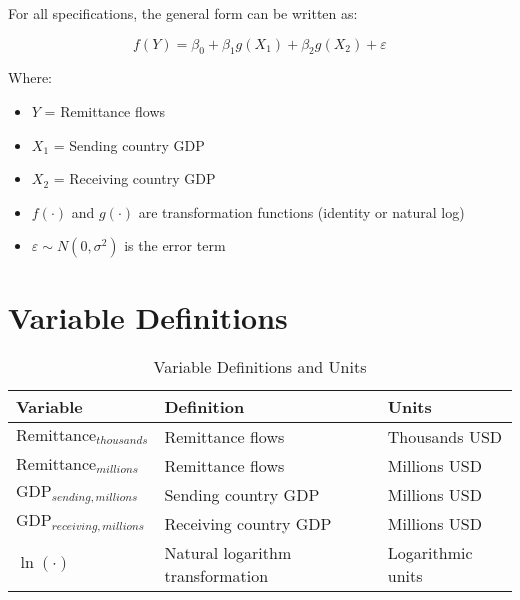 \documentclass{article}
\begin{document}
For all specifications, the general form can be written as:

\begin{equation}
f(Y) = \beta_0 + \beta_1 g(X_1) + \beta_2 g(X_2) + \varepsilon
\end{equation}

Where:
\begin{itemize}
    \item $Y$ = Remittance flows
    \item $X_1$ = Sending country GDP
    \item $X_2$ = Receiving country GDP
    \item $f(\cdot)$ and $g(\cdot)$ are transformation functions (identity or natural log)
    \item $\varepsilon \sim N(0, \sigma^2)$ is the error term
\end{itemize}

\section{Variable Definitions}

\begin{table}[h!]
\centering
\caption{Variable Definitions and Units}
\begin{tabular}{@{}lll@{}}
\toprule
\textbf{Variable} & \textbf{Definition} & \textbf{Units} \\
\midrule
$\text{Remittance}_{thousands}$ & Remittance flows & Thousands USD \\
$\text{Remittance}_{millions}$ & Remittance flows & Millions USD \\
$\text{GDP}_{sending,millions}$ & Sending country GDP & Millions USD \\
$\text{GDP}_{receiving,millions}$ & Receiving country GDP & Millions USD \\
$\ln(\cdot)$ & Natural logarithm transformation & Logarithmic units \\
\bottomrule
\end{tabular}
\end{table}
\end{document}
